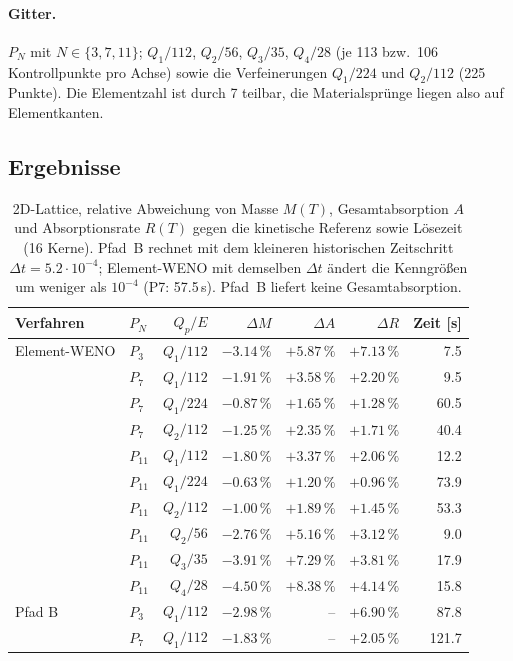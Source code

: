 \paragraph{Gitter.} $P_N$ mit $N\in\{3,7,11\}$; $Q_1/112$, $Q_2/56$, $Q_3/35$, $Q_4/28$
(je 113 bzw.\ 106 Kontrollpunkte pro Achse) sowie die Verfeinerungen $Q_1/224$ und $Q_2/112$
(225 Punkte). Die Elementzahl ist durch 7 teilbar, die Materialsprünge liegen also auf
Elementkanten.

\subsection{Ergebnisse}

\begin{table}[htbp]
  \centering
  \small
  \begin{tabular}{llrrrrr}
    \toprule
    Verfahren & $P_N$ & $Q_p/E$ & $\Delta M$ & $\Delta A$ & $\Delta R$ & Zeit [s] \\
    \midrule
    Element-WENO & $P_3$    & $Q_1/112$ & $-3.14\,\%$ & $+5.87\,\%$ & $+7.13\,\%$ & 7.5 \\
                 & $P_7$    & $Q_1/112$ & $-1.91\,\%$ & $+3.58\,\%$ & $+2.20\,\%$ & 9.5 \\
                 & $P_7$    & $Q_1/224$ & $-0.87\,\%$ & $+1.65\,\%$ & $+1.28\,\%$ & 60.5 \\
                 & $P_7$    & $Q_2/112$ & $-1.25\,\%$ & $+2.35\,\%$ & $+1.71\,\%$ & 40.4 \\
                 & $P_{11}$ & $Q_1/112$ & $-1.80\,\%$ & $+3.37\,\%$ & $+2.06\,\%$ & 12.2 \\
                 & $P_{11}$ & $Q_1/224$ & $-0.63\,\%$ & $+1.20\,\%$ & $+0.96\,\%$ & 73.9 \\
                 & $P_{11}$ & $Q_2/112$ & $-1.00\,\%$ & $+1.89\,\%$ & $+1.45\,\%$ & 53.3 \\
    \midrule
                 & $P_{11}$ & $Q_2/56$  & $-2.76\,\%$ & $+5.16\,\%$ & $+3.12\,\%$ & 9.0 \\
                 & $P_{11}$ & $Q_3/35$  & $-3.91\,\%$ & $+7.29\,\%$ & $+3.81\,\%$ & 17.9 \\
                 & $P_{11}$ & $Q_4/28$  & $-4.50\,\%$ & $+8.38\,\%$ & $+4.14\,\%$ & 15.8 \\
    \midrule
    Pfad B       & $P_3$    & $Q_1/112$ & $-2.98\,\%$ & --          & $+6.90\,\%$ & 87.8 \\
                 & $P_7$    & $Q_1/112$ & $-1.83\,\%$ & --          & $+2.05\,\%$ & 121.7 \\
    \bottomrule
  \end{tabular}
  \caption{2D-Lattice, relative Abweichung von Masse $M(T)$, Gesamtabsorption $A$ und
           Absorptionsrate $R(T)$ gegen die kinetische Referenz \cite{schotthoefer_hauck_2025}
           sowie Lösezeit (16 Kerne). Pfad~B rechnet mit dem kleineren historischen Zeitschritt
           $\Delta t=5.2\cdot10^{-4}$; Element-WENO mit demselben $\Delta t$ ändert die Kenngrößen um
           weniger als $10^{-4}$ (P7: 57.5\,s). Pfad~B liefert keine Gesamtabsorption.}
  \label{tab:lattice}
\end{table}

